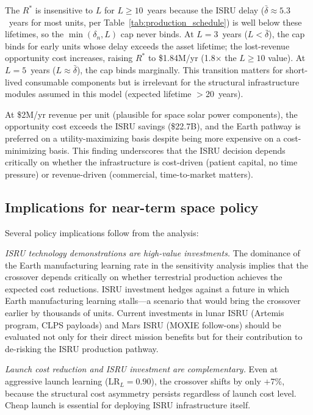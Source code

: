\documentclass[preprint,12pt]{elsarticle}
\begin{document}
The $R^*$ is insensitive to $L$ for $L \geq 10$~years because the ISRU delay ($\bar{\delta} \approx 5.3$~years for most units, per Table~\ref{tab:production_schedule}) is well below these lifetimes, so the $\min(\delta_n, L)$ cap never binds. At $L = 3$~years ($L < \bar{\delta}$), the cap binds for early units whose delay exceeds the asset lifetime; the lost-revenue opportunity cost increases, raising $R^*$ to \$1.84M/yr (1.8$\times$ the $L \geq 10$ value). At $L = 5$~years ($L \approx \bar{\delta}$), the cap binds marginally. This transition matters for short-lived consumable components but is irrelevant for the structural infrastructure modules assumed in this model (expected lifetime $>$20~years).

At \$2M/yr revenue per unit (plausible for space solar power components), the opportunity cost exceeds the ISRU savings (\$22.7B), and the Earth pathway is preferred on a utility-maximizing basis despite being more expensive on a cost-minimizing basis. This finding underscores that the ISRU decision depends critically on whether the infrastructure is cost-driven (patient capital, no time pressure) or revenue-driven (commercial, time-to-market matters).

\subsection{Implications for near-term space policy}

Several policy implications follow from the analysis:

\emph{ISRU technology demonstrations are high-value investments.} The dominance of the Earth manufacturing learning rate in the sensitivity analysis implies that the crossover depends critically on whether terrestrial production achieves the expected cost reductions. ISRU investment hedges against a future in which Earth manufacturing learning stalls---a scenario that would bring the crossover earlier by thousands of units. Current investments in lunar ISRU (Artemis program, CLPS payloads) and Mars ISRU (MOXIE follow-ons) should be evaluated not only for their direct mission benefits but for their contribution to de-risking the ISRU production pathway.

\emph{Launch cost reduction and ISRU investment are complementary.} Even at aggressive launch learning ($\mathrm{LR}_L = 0.90$), the crossover shifts by only $+$7\%, because the structural cost asymmetry persists regardless of launch cost level. Cheap launch is essential for deploying ISRU infrastructure itself.
\end{document}
